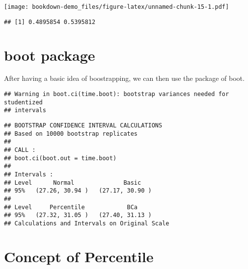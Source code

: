 \documentclass[]{book}
\newenvironment{Shaded}{\begin{snugshade}}{\end{snugshade}}
\newcommand{\ControlFlowTok}[1]{\textcolor[rgb]{0.13,0.29,0.53}{\textbf{#1}}}
\newcommand{\DecValTok}[1]{\textcolor[rgb]{0.00,0.00,0.81}{#1}}
\newcommand{\KeywordTok}[1]{\textcolor[rgb]{0.13,0.29,0.53}{\textbf{#1}}}
\newcommand{\NormalTok}[1]{#1}
\newcommand{\OperatorTok}[1]{\textcolor[rgb]{0.81,0.36,0.00}{\textbf{#1}}}
\newcommand{\StringTok}[1]{\textcolor[rgb]{0.31,0.60,0.02}{#1}}
\begin{document}
\texttt{[image: bookdown-demo\_files/figure-latex/unnamed-chunk-15-1.pdf]}

\begin{verbatim}
## [1] 0.4895854 0.5395812
\end{verbatim}

\hypertarget{boot-package}{%
\section{boot package}\label{boot-package}}

After having a basic idea of boostrapping, we can then use the package of boot.

\begin{Shaded}
\end{Shaded}

\begin{verbatim}
## Warning in boot.ci(time.boot): bootstrap variances needed for studentized
## intervals
\end{verbatim}

\begin{verbatim}
## BOOTSTRAP CONFIDENCE INTERVAL CALCULATIONS
## Based on 10000 bootstrap replicates
## 
## CALL : 
## boot.ci(boot.out = time.boot)
## 
## Intervals : 
## Level      Normal              Basic         
## 95%   (27.26, 30.94 )   (27.17, 30.90 )  
## 
## Level     Percentile            BCa          
## 95%   (27.32, 31.05 )   (27.40, 31.13 )  
## Calculations and Intervals on Original Scale
\end{verbatim}

\hypertarget{concept-of-percentile}{%
\section{Concept of Percentile}\label{concept-of-percentile}}
\end{document}
